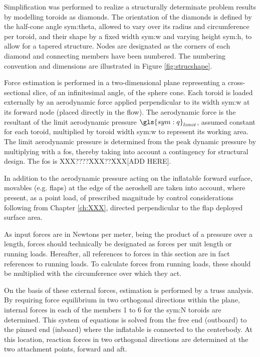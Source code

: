 Simplification was performed to realize a structurally determinate problem results by modelling toroids as diamonds. The orientation of the diamonds is defined by the half-cone angle \gls{sym:theta}, allowed to vary over its radius and circumference per toroid, and their shape by a fixed width \gls{sym:w} and varying height \gls{sym:h}, to allow for a tapered structure. Nodes are designated as the corners of each diamond and connecting members have been numbered. The numbering convention and dimensions are illustrated in Figure \ref{fig:strucshape}. 

Force estimation is performed in a two-dimensional plane representing a cross-sectional slice, of an infinitesimal angle, of the sphere cone. Each toroid is loaded externally by an aerodynamic force applied perpendicular to its width \gls{sym:w} at its forward node (placed directly in the flow). The aerodynamic force is the resultant of the limit aerodynamic pressure $\gls{sym:q}_{limit}$, assumed constant for each toroid, multiplied by toroid width \gls{sym:w} to represent its working area. The limit aerodynamic pressure is determined from the peak dynamic pressure by multiplying with a \acrfull{fos}, thereby taking into account a contingency for structural design. The \gls{fos} is XXX????XXX??XXX[ADD HERE]. 

In addition to the aerodynamic pressure acting on the inflatable forward surface, movables (e.g. flaps) at the edge of the aeroshell are taken into account, where present, as a point load, of prescribed magnitude by control considerations following from Chapter \ref{ch:XXX}, directed perpendicular to the flap deployed surface area.

As input forces are in Newtons per meter, being the product of a pressure over a length, forces should technically be designated as forces per unit length or running loads. Hereafter, all references to forces in this section are in fact references to running loads. To calculate forces from running loads, these should be multiplied with the circumference over which they act.

On the basis of these external forces, estimation is performed by a truss analysis. By requiring force equilibrium in two orthogonal directions within the plane, internal forces in each of the members 1 to 6 for the \gls{sym:N} toroids are determined. This system of equations is solved from the free end (outboard) to the pinned end (inboard) where the inflatable is connected to the centerbody. At this location, reaction forces in two orthogonal directions are determined at the two attachment points, forward and aft.

